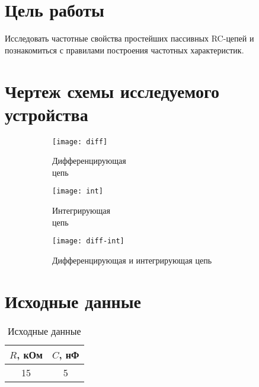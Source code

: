 





\section{Цель работы}

Исследовать частотные свойства простейших пассивных RC­-цепей и познакомиться с правилами построения частотных характеристик.

\section{Чертеж схемы исследуемого устройства}

\begin{figure}[H]
\begin{center}
	\begin{subfigure}[b]{0.3\textwidth}
		\texttt{[image: diff]}
		\caption{Дифференцирующая\\ цепь}
	\end{subfigure}
	\begin{subfigure}[b]{0.3\textwidth}
		\texttt{[image: int]}
		\caption{Интегрирующая\\ цепь}
	\end{subfigure}
	\begin{subfigure}[b]{0.3\textwidth}
		\texttt{[image: diff-int]}
		\captionsetup{justification=centering}
		\caption{Дифференцирующая и интегрирующая цепь}
	\end{subfigure}
	\caption{}
\end{center}
\end{figure}

\section{Исходные данные}

\begin{table}[H]
\begin{center}
	\caption{Исходные данные}
	\def\tabcolsep{50pt}
	\begin{tabular}{|c|c|}
		\hline
		$R$, кОм & $C$, нФ \\
		\hline
		15 & 5 \\
		\hline	
	\end{tabular}
\end{center}
\end{table}

